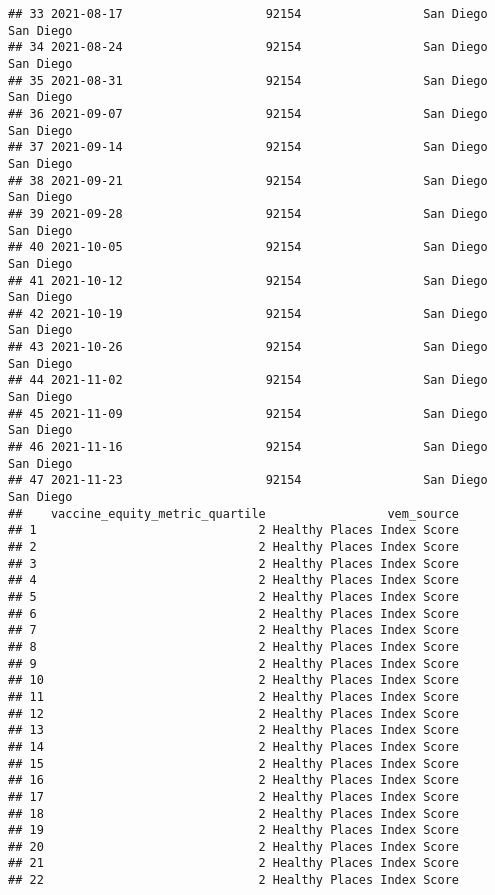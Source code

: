 \documentclass[
]{article}
\begin{document}
\begin{verbatim}
## 33 2021-08-17                    92154                 San Diego San Diego
## 34 2021-08-24                    92154                 San Diego San Diego
## 35 2021-08-31                    92154                 San Diego San Diego
## 36 2021-09-07                    92154                 San Diego San Diego
## 37 2021-09-14                    92154                 San Diego San Diego
## 38 2021-09-21                    92154                 San Diego San Diego
## 39 2021-09-28                    92154                 San Diego San Diego
## 40 2021-10-05                    92154                 San Diego San Diego
## 41 2021-10-12                    92154                 San Diego San Diego
## 42 2021-10-19                    92154                 San Diego San Diego
## 43 2021-10-26                    92154                 San Diego San Diego
## 44 2021-11-02                    92154                 San Diego San Diego
## 45 2021-11-09                    92154                 San Diego San Diego
## 46 2021-11-16                    92154                 San Diego San Diego
## 47 2021-11-23                    92154                 San Diego San Diego
##    vaccine_equity_metric_quartile                 vem_source
## 1                               2 Healthy Places Index Score
## 2                               2 Healthy Places Index Score
## 3                               2 Healthy Places Index Score
## 4                               2 Healthy Places Index Score
## 5                               2 Healthy Places Index Score
## 6                               2 Healthy Places Index Score
## 7                               2 Healthy Places Index Score
## 8                               2 Healthy Places Index Score
## 9                               2 Healthy Places Index Score
## 10                              2 Healthy Places Index Score
## 11                              2 Healthy Places Index Score
## 12                              2 Healthy Places Index Score
## 13                              2 Healthy Places Index Score
## 14                              2 Healthy Places Index Score
## 15                              2 Healthy Places Index Score
## 16                              2 Healthy Places Index Score
## 17                              2 Healthy Places Index Score
## 18                              2 Healthy Places Index Score
## 19                              2 Healthy Places Index Score
## 20                              2 Healthy Places Index Score
## 21                              2 Healthy Places Index Score
## 22                              2 Healthy Places Index Score

\end{verbatim}
\end{document}
